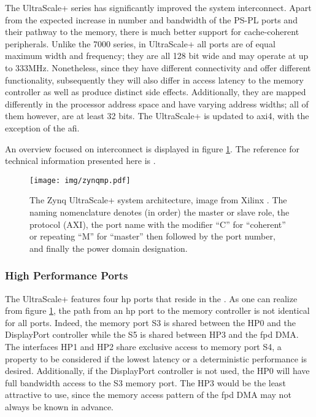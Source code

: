 The UltraScale+ series has significantly improved the system interconnect.
Apart from the expected increase in number and bandwidth of the
PS-PL ports and their pathway to the memory, there is much better support
for cache-coherent peripherals. 
Unlike the 7000 series, in UltraScale+ 
all ports are of equal maximum width and frequency; 
they are all 128 bit wide and may operate at up to 333MHz.
Nonetheless, since they have different connectivity and offer different
functionality, subsequently they will also differ in access latency to
the memory controller as well as produce distinct side effects. 
Additionally, they are mapped differently in the
processor address space and have varying address widths; all of them
however, are at least 32 bits.
The UltraScale+ is updated to \gls{axi}4, with the exception of the \gls{afi}.

An overview focused on interconnect
is displayed in figure \ref{fig:zynqmp-interconnect}. 
The reference for technical information presented here is \cite{ug1085}.

\begin{figure}[htbp]
  \centering
  \texttt{[image: img/zynqmp.pdf]}
  \caption{The Zynq UltraScale+ system architecture, image from Xilinx \cite{ug1085}.
  The naming nomenclature denotes (in order) the master or slave role, 
  the protocol (AXI), the port name with the modifier ``C'' for ``coherent'' or
  repeating ``M'' for ``master'' then followed by the port number, and finally
  the power domain designation.
  }
  \label{fig:zynqmp-interconnect}
\end{figure}


\subsubsection{High Performance Ports}
\label{sect:implementation}

The UltraScale+ features four \gls{hp} ports that reside in the .
As one can realize from figure \ref{fig:zynqmp-interconnect},
the path from an \gls{hp} port to the memory controller is not identical for all ports.
Indeed, the memory port S3 is shared between the HP0 and the DisplayPort controller
while the S5 is shared between HP3 and the \gls{fpd} DMA.
The interfaces HP1 and HP2 share exclusive access to memory port S4,
a property to be considered if the lowest latency 
or a deterministic performance is desired. Additionally, if the DisplayPort
controller is not used, the HP0 will have full bandwidth access to the S3 memory port.
The HP3 would be the least attractive to use, 
since the memory access pattern of the \gls{fpd}
DMA may not always be known in advance.

